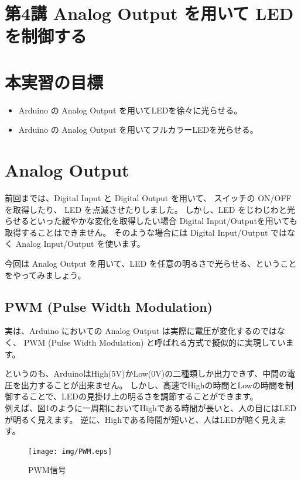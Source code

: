 \documentclass[11pt,a4paper]{jarticle}
\begin{document}
\section*{\LARGE{第4講 Analog Output を用いて LED を制御する}}
\section{本実習の目標}
\begin{itemize}
 \item Arduino の Analog Output を用いてLEDを徐々に光らせる。
 \item Arduino の Analog Output を用いてフルカラーLEDを光らせる。
\end{itemize}

\section{Analog Output}
前回までは、Digital Input と Digital Output を用いて、
スイッチの ON/OFF を取得したり、 LED を点滅させたりしました。
しかし、LED をじわじわと光らせるといった緩やかな変化を取得したい場合
Digital Input/Outputを用いても取得することはできません。
そのような場合には Digital Input/Output ではなく Analog Input/Output を使います。

今回は Analog Output を用いて、LED を任意の明るさで光らせる、ということをやってみましょう。

\subsection*{PWM (Pulse Width Modulation)}
実は、Arduino においての Analog Output は実際に電圧が変化するのではなく、
PWM (Pulse Width Modulation) と呼ばれる方式で擬似的に実現しています。

というのも、ArduinoはHigh(5V)かLow(0V)の二種類しか出力できず、中間の電圧を出力することが出来ません。
しかし、高速でHighの時間とLowの時間を制御することで、LEDの見掛け上の明るさを調節することができます。
\\

例えば、図1のように一周期においてHighである時間が長いと、人の目にはLEDが明るく見えます。
逆に、Highである時間が短いと、人はLEDが暗く見えます。

\begin{figure}[htbp]
  \centering
  \texttt{[image: img/PWM.eps]}
 \caption{PWM信号}
  \label{figure:LED}
\end{figure}
\end{document}
